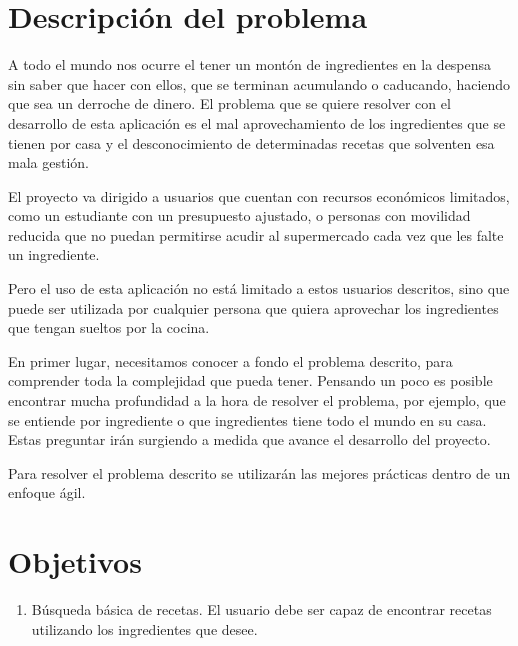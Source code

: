 \section{Descripción del problema}
A todo el mundo nos ocurre el tener un montón de ingredientes en la despensa sin saber que hacer con ellos, que se terminan acumulando o caducando, haciendo que sea un derroche de dinero. El problema que se quiere resolver con el desarrollo de esta aplicación es el mal aprovechamiento de los ingredientes que se tienen por casa y el desconocimiento de determinadas recetas que solventen esa mala gestión.

El proyecto va dirigido a usuarios que cuentan con recursos económicos limitados, como un estudiante con un presupuesto ajustado, o personas con movilidad reducida que no puedan permitirse acudir al supermercado cada vez que les falte un ingrediente. 

Pero el uso de esta aplicación no está limitado a estos usuarios descritos, sino que puede ser utilizada por cualquier persona que quiera aprovechar los ingredientes que tengan sueltos por la cocina.

En primer lugar, necesitamos conocer a fondo el problema descrito, para comprender toda la complejidad que pueda tener. Pensando un poco es posible encontrar mucha profundidad a la hora de resolver el problema, por ejemplo, que se entiende por ingrediente o que ingredientes tiene todo el mundo en su casa. Estas preguntar irán surgiendo a medida que avance el desarrollo del proyecto.

Para resolver el problema descrito se utilizarán las mejores prácticas dentro de un enfoque ágil.

\section{Objetivos}
\begin{enumerate} 
    \item Búsqueda básica de recetas. El usuario debe ser capaz de encontrar recetas utilizando los ingredientes que desee.
\end{enumerate}